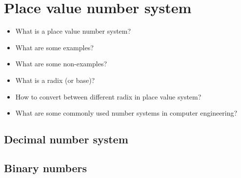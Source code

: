 
\section{Place value number system}

\begin{itemize}
\item What is a place value number system?
\item What are some examples?
\item What are some non-examples?
\item What is a radix (or base)? 
\item How to convert between different radix in place value system?
\item What are some commonly used number systems in computer engineering?
\end{itemize}

\subsection{Decimal number system}

\vspace{15em}
\begin{comment}
A decimal number 1342 can be written as
\begin{align*}
  1342&=1\times1000 + 3\times100 + 4\times10 + 2\times1
        \\
      &=1\times10^3 + 3\times10^2+4\times10^1 + 2\times10^0.
\end{align*}

Decimal numbers are said to be of base (or radix) 10. One can generalize this
idea to arbitrary base (or radix) $r$. The same number expressed in some other
base $r$ will have a very different value:
\begin{align*}
  (1342)_r &=1\times r^3 + 3\times r^2+4\times r^1 + 2\times r^0.
\end{align*}

In general the \emph{value} of a arbitrary $n$-digit number $d_{n-1}d_{n-2}
\dots d_1 d_0$ in base $r$ is:
\begin{align*}
  (d_{n-1}d_{n-2} \dots d_1 d_0)_r &=d_{n-1} \times r^{n-1} + d_{n-2}\times r^{n-2}+ \dots + d_1\times r^1 + d_0\times r^0 &= \sum_{k=0}^{n-1} d_k r^k
\end{align*}
Each digit value is always smaller than base $d_k <= r-1$.
\end{comment}

\subsection{Binary numbers}

